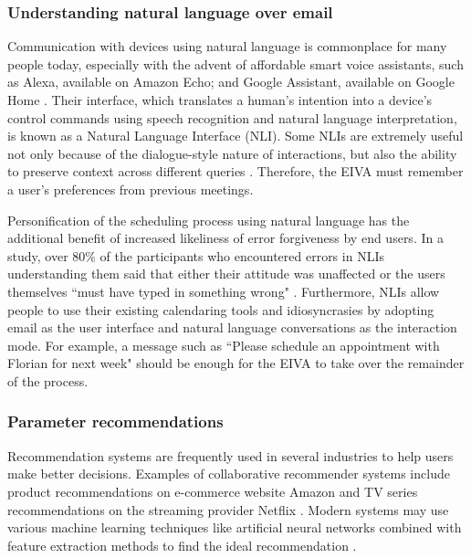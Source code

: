 \documentclass{article}
\begin{document}
\subsubsection{Understanding natural language over email}

Communication with devices using natural language is commonplace for many people today, especially with the advent of affordable smart voice assistants, such as Alexa, available on Amazon Echo; and Google Assistant, available on Google Home \cite{de_barcelos_silva_intelligent_2020}. Their interface, which translates a human's intention into a device's control commands using speech recognition and natural language interpretation, is known as a Natural Language Interface (NLI). Some NLIs are extremely useful not only because of the dialogue-style nature of interactions, but also the ability to preserve context across different queries \cite{kiseleva_predicting_2016}. Therefore, the EIVA must remember a user's preferences from previous meetings. 

Personification of the scheduling process using natural language has the additional benefit of increased likeliness of error forgiveness by end users. In a study, over 80\% of the participants who encountered errors in NLIs understanding them said that either their attitude was unaffected or the users themselves ``must have typed in something wrong" \cite{kelley_iterative_1984}. Furthermore, NLIs allow people to use their existing calendaring tools and idiosyncrasies by adopting email as the user interface and natural language conversations as the interaction mode. For example, a message such as ``Please schedule an appointment with Florian for next week" should be enough for the EIVA to take over the remainder of the process.

\subsubsection{Parameter recommendations}

Recommendation systems are frequently used in several industries to help users make better decisions. Examples of collaborative recommender systems include product recommendations on e-commerce website Amazon \cite{linden_amazon.com_2003} and TV series recommendations on the streaming provider Netflix \cite{gomez-uribe_netflix_2016}. Modern systems may use various machine learning techniques like artificial neural networks combined with feature extraction methods to find the ideal recommendation \cite{adomavicius_toward_2005}.
\end{document}
